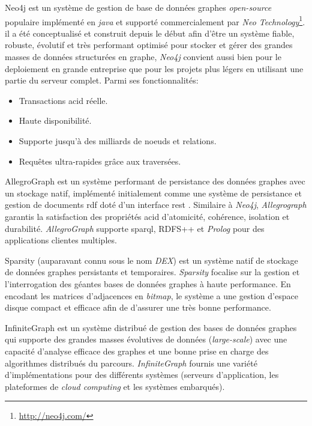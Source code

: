     \textsf{Neo4j} \cite{neo4j} est un système de gestion de base de
    données graphes \textit{open-source} populaire implémenté en
    \textit{java} et supporté commercialement par \textit{Neo
      Technology}\footnote{\url{http://neo4j.com/}}. il a été
    conceptualisé et construit depuis le début afin d'être un système
    fiable, robuste, évolutif et très performant optimisé pour stocker
    et gérer des grandes masses de données structurées en graphe,
    \textit{Neo4j} convient aussi bien pour le deploiement en grande
    entreprise que pour les projets plus légers en utilisant une
    partie du serveur complet. Parmi ses fonctionnalités:

    \begin{itemize}\renewcommand\labelitemi{--}
    \item Transactions \acrshort{acid} réelle.
    \item Haute disponibilité.
    \item Supporte jusqu'à des milliards de noeuds et relations.
    \item Requêtes ultra-rapides grâce aux traversées.
    \end{itemize}
    \enddescription
    \bigskip

    \textsf{AllegroGraph} \cite{allegrograph} est un système performant
    de persistance des données graphes avec un stockage natif,
    implémenté initialement comme une système de persistance et
    gestion de documents \acrshort{rdf} doté d'un interface
    \acrshort{rest} \cite{fielding2000architectural}. Similaire à
    \emph{Neo4j}, \emph{Allegrograph} garantis la satisfaction des
    propriétés \acrshort{acid} d'atomicité, cohérence, isolation et
    durabilité. \emph{AllegroGraph} supporte \acrshort{sparql}, RDFS++
    et \textit{Prolog} pour des applications clientes
    multiples.\bigskip

    \textsf{Sparsity} \cite{sparksee} (auparavant connu sous le nom
    \emph{DEX}) est un système natif de stockage de données graphes
    persistants et temporaires. \emph{Sparsity} focalise sur la
    gestion et l'interrogation des géantes bases de données graphes à
    haute performance. En encodant les matrices d'adjacences en
    \emph{bitmap}, le système a une gestion d'espace disque compact et
    efficace afin de d'assurer une très bonne performance.\medskip
    \newpage

    \textsf{InfiniteGraph} \cite{infinitegraph} est un système
    distribué de gestion des bases de données graphes qui supporte des
    grandes masses évolutives de données (\emph{large-scale}) avec une
    capacité d'analyse efficace des graphes et une bonne prise en
    charge des algorithmes distribués du
    parcours. \emph{InfiniteGraph} fournis une variété
    d'implémentations pour des différents systèmes (serveurs
    d'application, les plateformes de \emph{cloud computing} et les
    systèmes embarqués).

